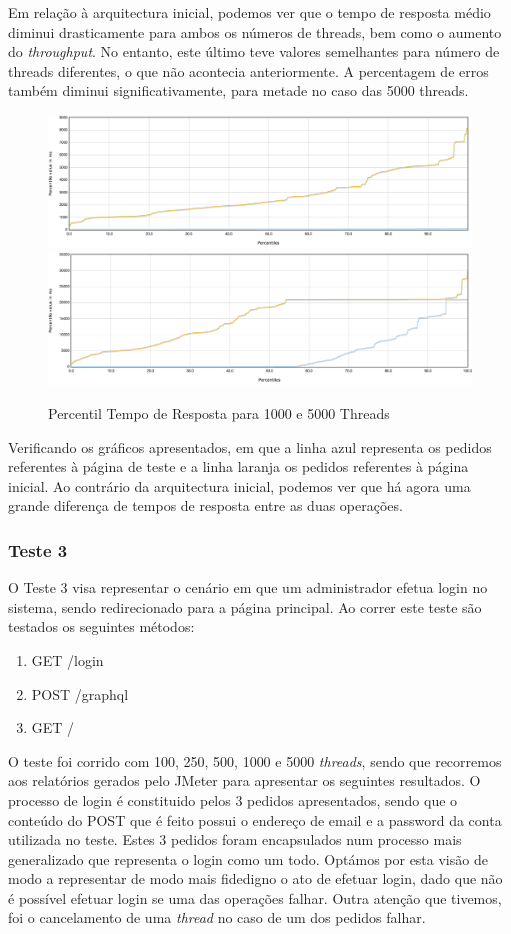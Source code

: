 Em relação à arquitectura inicial, podemos ver que o tempo de resposta médio diminui drasticamente para ambos os números de threads, bem como o aumento do \textit{throughput}. No entanto, este último teve valores semelhantes para número de threads diferentes, o que não acontecia anteriormente. A percentagem de erros também diminui significativamente, para metade no caso das 5000 threads. 

\begin{figure}[ht!]
    \centering
    \includegraphics[width=.45\linewidth]{img/testes/i2-t2-1000.png}
    \includegraphics[width=.45\linewidth]{img/testes/i2-t2-5000.png}
    \caption{Percentil Tempo de Resposta para 1000 e 5000 Threads}
\end{figure}

Verificando os gráficos apresentados, em que a linha azul representa os pedidos referentes à página de teste e a linha laranja os pedidos referentes à página inicial. Ao contrário da arquitectura inicial, podemos ver que há agora uma grande diferença de tempos de resposta entre as duas operações.

\subsubsection{Teste 3}

O Teste 3 visa representar o cenário em que um administrador efetua login no sistema, sendo redirecionado para a página principal. Ao correr este teste são testados os seguintes métodos:

\begin{enumerate}
  \item GET  /login
  \item POST /graphql
  \item GET  /
\end{enumerate}

O teste foi corrido com 100, 250, 500, 1000 e 5000 \textit{threads}, sendo que recorremos aos relatórios gerados pelo JMeter para apresentar os seguintes resultados.
O processo de login é constituido pelos 3 pedidos apresentados, sendo que o conteúdo do POST que é feito possui o endereço de email e a password da conta utilizada no teste. Estes 3 pedidos foram encapsulados num processo mais generalizado que representa o login como um todo. Optámos por esta visão de modo a representar de modo mais fidedigno o ato de efetuar login, dado que não é possível efetuar login se uma das operações falhar. Outra atenção que tivemos, foi o cancelamento de uma \textit{thread} no caso de um dos pedidos falhar.

